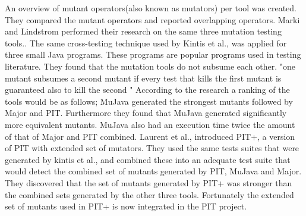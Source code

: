 \documentclass[../main]{subfiles}
\begin{document}
An overview of mutant operators(also known as mutators) per tool was created. 
They compared the mutant operators and reported overlapping operators.
\newline
Marki and Lindstrom performed their research on the same three mutation testing tools.\cite{Marki2017MutationJava}. 
The same cross-testing technique used by Kintis et al., was applied for three small Java programs. 
These programs are popular programs used in testing literature.
They found that the mutation tools do not subsume each other. 
"one mutant subsumes a second mutant if every test that kills the first mutant is guaranteed also to kill the second \cite{Ammann2014EstablishingMutants}"
According to the research a ranking of the tools would be as follows; MuJava generated the strongest mutants followed by Major and PIT.
Furthermore they found that MuJava generated significantly more equivalent mutants\cite{Marki2017MutationJava}.
MuJava also had an execution time twice the amount of that of Major and PIT combined.
\newline
Laurent et al., introduced PIT+, a version of PIT with extended set of mutators\cite{Laurent2017AssessingPIT}.
They used the same tests suites that were generated by kintis et al., and combined these into an adequate test suite that would detect the combined set of mutants generated by PIT, MuJava and Major. 
They discovered that the set of mutants generated by PIT+ was stronger than the combined sets generated by the other three tools.
Fortunately the extended set of mutants used in PIT+ is now integrated in the PIT project\cite{pit+}.
\end{document}
